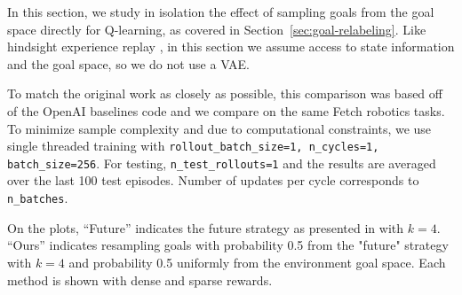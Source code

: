 In this section, we study in isolation the effect of sampling goals from the goal space directly for Q-learning, as covered in Section~\ref{sec:goal-relabeling}.
Like hindsight experience replay \cite{andrychowicz2017her}, in this section we assume access to state information and the goal space, so we do not use a VAE.

To match the original work as closely as possible, this comparison was based off of the OpenAI baselines code \cite{plappert2018techreport} and we compare on the same Fetch robotics tasks. To minimize sample complexity and due to computational constraints, we use single threaded training with \texttt{rollout\_batch\_size=1, n\_cycles=1, batch\_size=256}. For testing, \texttt{n\_test\_rollouts=1} and the results are averaged over the last 100 test episodes. Number of updates per cycle corresponds to \texttt{n\_batches}.

On the plots, ``Future'' indicates
the future strategy as presented in \citet{andrychowicz2017her} with $k=4$. ``Ours'' indicates
resampling goals with probability 0.5 from the "future" strategy with $k=4$ and probability 0.5 uniformly from the environment goal space. Each method is shown with dense and sparse rewards.

